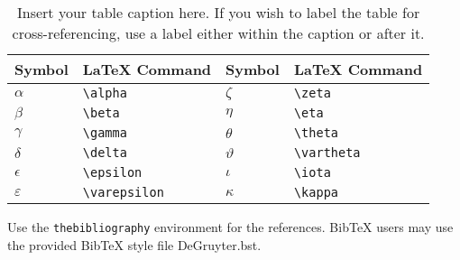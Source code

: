 \documentclass[letterpaper,12pt]{article}
\begin{document}
\begin{table}[!h]
\centering
\caption{Insert your table caption here. If you wish to label the table for
  cross-referencing, use a label either within the caption or after it.}
\begin{tabular}{llll}
\hline
Symbol        & LaTeX Command      & Symbol      & LaTeX Command \\
\hline
$\alpha$      & \verb+\alpha+      & $\zeta$     & \verb+\zeta+ \\
$\beta$       & \verb+\beta+       & $\eta$      & \verb+\eta+ \\
$\gamma$      & \verb+\gamma+      & $\theta$    & \verb+\theta+ \\
$\delta$      & \verb+\delta+      & $\vartheta$ & \verb+\vartheta+ \\
$\epsilon$    & \verb+\epsilon+    & $\iota$     & \verb+\iota+ \\
$\varepsilon$ & \verb+\varepsilon+ & $\kappa$    & \verb+\kappa+ \\
\hline
\end{tabular}
\end{table}

Use the \verb+thebibliography+ environment for the references.  BibTeX users may
use the provided BibTeX style file DeGruyter.bst.



\end{document}
